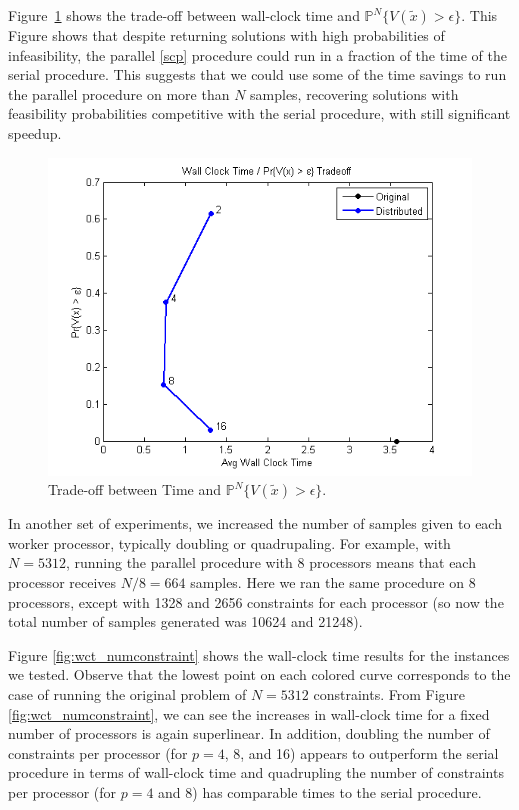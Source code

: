 \documentclass[12pt]{article}
\begin{document}
Figure~\ref{fig:wct_probviolprobgreateps_frontier} shows the trade-off between wall-clock time and $\mathbb{P}^N\{V(\tilde{x}) > \epsilon \}$.  
This Figure shows that despite returning solutions with high probabilities of infeasibility, the parallel \ref{scp} procedure could run in a fraction of the time of the serial procedure.
This suggests that we could use some of the time savings to run the parallel procedure on more than $N$ samples, recovering solutions with feasibility probabilities competitive with the serial procedure, with still significant speedup.

\begin{figure}[ht]
	\centering
		\includegraphics[scale=0.9]{../plot/figs/wct_probviolprobgreateps_frontier.png}
	\caption{Trade-off between Time and $\mathbb{P}^N\{V(\tilde{x}) > \epsilon \}$.}
	\label{fig:wct_probviolprobgreateps_frontier}
\end{figure}

In another set of experiments, we increased the number of samples given to each worker processor, typically doubling or quadrupaling.
For example, with $N = 5312$, running the parallel procedure with 8 processors means that each processor receives $N/8 = 664$ samples.
Here we ran the same procedure on 8 processors, except with 1328 and 2656 constraints for each processor (so now the total number of samples generated was 10624 and 21248).

Figure \ref{fig:wct_numconstraint} shows the wall-clock time results for the instances we tested.
Observe that the lowest point on each colored curve corresponds to the case of running the original problem of $N = 5312$ constraints.
From Figure \ref{fig:wct_numconstraint}, we can see the increases in wall-clock time for a fixed number of processors is again superlinear.
In addition, doubling the number of constraints per processor (for $p =4$, 8, and 16) appears to outperform the serial procedure in terms of wall-clock time and quadrupling the number of constraints per processor (for $p = 4$ and 8) has comparable times to the serial procedure.
\end{document}
